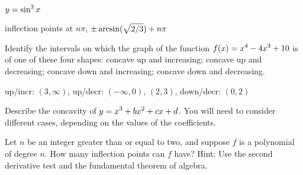 \begin{exercises}
\begin{exercise} $\displaystyle y = \sin^3 x$
\begin{answer} inflection points at $n\pi$, $\displaystyle \pm\arcsin(\sqrt{2/3})+n\pi$
\end{answer}\end{exercise}

\endtwocol

\msk \begin{exercise} Identify the intervals on which the graph of the function
$\displaystyle f(x) = x^4-4x^3 +10$ is of one of these four
shapes: concave up and increasing; concave up and decreasing; concave
down and increasing; concave down and decreasing.
\begin{answer} up/incr: $(3,\infty)$, up/decr: $(-\infty,0)$, $(2,3)$,
down/decr: $(0,2)$
\end{answer}\end{exercise}

\begin{exercise} Describe the concavity of $\displaystyle y =  x^3 + bx^2 + cx + d$.
You will need to consider different cases, depending on the values of
the coefficients.
\end{exercise}

\begin{exercise} Let $n$ be an integer greater than or equal to
two, and suppose $f$ is a polynomial of degree $n$. How many inflection points
can $f$ have?  Hint: Use the second derivative test and the
fundamental theorem of algebra.
\end{exercise}


\end{exercises}
